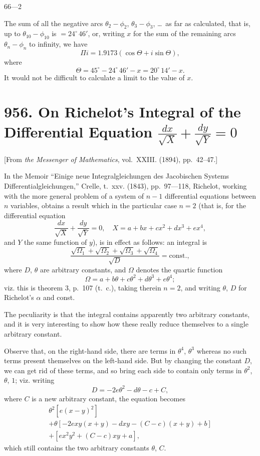 \documentclass[12pt,a4paper]{article}
\theoremstyle{definition}
\begin{document}
\hfill 66---2

\newpage

The sum of all the negative arcs $\theta_2-\phi_2$, $\theta_3-\phi_3$, \dots\ as far as calculated, that is, up to $\theta_{10}-\phi_{10}$ is $= 24^{\circ}\,46'$, or, writing $x$ for the sum of the remaining arcs $\theta_n-\phi_n$ to infinity, we have
\[
\Pi i = 1.9173(\cos\Theta + i\sin\Theta),
\]
where
\[
\Theta = 45^{\circ} - 24^{\circ}\,46' - x = 20^{\circ}\,14' - x.
\]
It would not be difficult to calculate a limit to the value of $x$.

\newpage
\section{956. On Richelot's Integral of the Differential Equation $\frac{dx}{\sqrt{X}} + \frac{dy}{\sqrt{Y}} = 0$}
\label{sec:956}

[From \textit{the Messenger of Mathematics}, vol.~XXIII. (1894), pp.~42--47.]
\bigskip

In the Memoir ``Einige neue Integralgleichungen des Jacobischen Systems Differentialgleichungen,'' Crelle, t.~xxv. (1843), pp.~97---118, Richelot, working with the more general problem of a system of $n-1$ differential equations between $n$ variables, obtains a result which in the particular case $n=2$ (that is, for the differential equation
\[
\frac{dx}{\sqrt{X}} + \frac{dy}{\sqrt{Y}} = 0, \quad X = a + bx + cx^2 + dx^3 + ex^4,
\]
and $Y$ the same function of $y$), is in effect as follows: an integral is
\[
\frac{\sqrt{\Omega_1}+\sqrt{\Omega_2}+\sqrt{\Omega_3}+\sqrt{\Omega_4}}{\sqrt{D}} = \text{const.},
\]
where $D$, $\theta$ are arbitrary constants, and $\Omega$ denotes the quartic function
\[
\Omega = a + b\theta + c\theta^2 + d\theta^3 + e\theta^4;
\]
viz. this is theorem 3, p.~107 (t.~c.), taking therein $n=2$, and writing $\theta$, $D$ for Richelot's $\alpha$ and const.

The peculiarity is that the integral contains apparently two arbitrary constants, and it is very interesting to show how these really reduce themselves to a single arbitrary constant.

Observe that, on the right-hand side, there are terms in $\theta^4$, $\theta^3$ whereas no such terms present themselves on the left-hand side. But by changing the constant $D$, we can get rid of these terms, and so bring each side to contain only terms in $\theta^2$, $\theta$, $1$; viz. writing
\[
D = -2e\theta^2 - d\theta - c + C,
\]
where $C$ is a new arbitrary constant, the equation becomes
\begin{multline*}
\theta^2\left[e(x-y)^2\right] \\
+ \theta\left[-2exy(x+y) - dxy - (C-c)(x+y) + b\right] \\
+ \left[ex^2y^2 + (C-c)xy + a\right],
\end{multline*}
which still contains the two arbitrary constants $\theta$, $C$.
\end{document}

